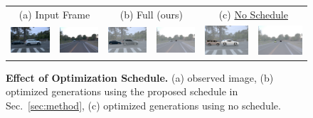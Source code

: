 \begin{figure}[t!]
\renewcommand{\arraystretch}{0.4}
\centering
\begin{tabular}{@{}c@{\hskip .1cm}c@{\hskip .1cm}c@{\hskip .1cm}c@{\hskip .1cm}c@{\hskip .1cm}c@{}}
    \multicolumn{2}{c}{(a) Input Frame} & \multicolumn{2}{c}{(b) Full (ours)} & \multicolumn{2}{c}{(c) \underline{No Schedule}} \\
    \includegraphics[width=.16\columnwidth, trim={0cm 0cm 0cm 0cm},clip]{fig/rebuttal_optimization/gt/11_102_gt.png}&
    \includegraphics[width=.16\columnwidth, trim={22cm 16.68cm 30cm 18cm},clip]{fig/rebuttal_optimization/gt/82_60_gt_img.png}&
    \includegraphics[width=.16\columnwidth, trim={0cm 0cm 0cm 0cm},clip]{fig/rebuttal_optimization/sched/11_102_sched.png}&
    \includegraphics[width=.16\columnwidth, trim={22cm 16.68cm 30cm 18cm},clip]{fig/rebuttal_optimization/sched/82_60_shed.png}&
    \includegraphics[width=.16\columnwidth, trim={0cm 0cm 0cm 0cm},clip]{fig/rebuttal_optimization/no_sched/11_102_no_sched.png}&    	\includegraphics[width=.16\columnwidth, trim={22cm 16.68cm 30cm 18cm},clip]{fig/rebuttal_optimization/no_sched/82_60_no_shed.png}\\
    \end{tabular}
    \vspace*{-6pt}
    \caption{\textbf{Effect of Optimization Schedule.} (a) observed image, (b) optimized generations using the proposed schedule in Sec.~\ref{sec:method}, (c) optimized generations using no schedule. 
} 
	\label{fig:opt_scheduler}
\end{figure}